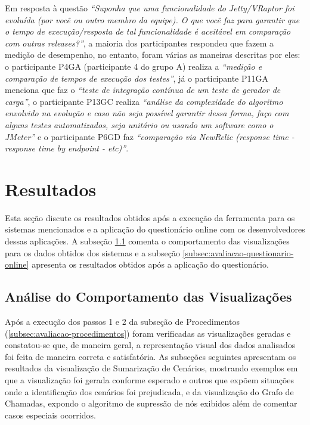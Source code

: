 Em resposta à questão \textit{``Suponha que uma funcionalidade do Jetty/VRaptor foi evoluída (por você ou outro membro da equipe). O que você faz para garantir que o tempo de execução/resposta de tal funcionalidade é aceitável em comparação com outras releases?''}, a maioria dos participantes respondeu que fazem a medição de desempenho, no entanto, foram várias as maneiras descritas por eles: o participante P4GA (participante 4 do grupo A) realiza a \textit{``medição e comparação de tempos de execução dos testes''}, já o participante P11GA menciona que faz o \textit{``teste de integração contínua de um teste de gerador de carga''}, o participante P13GC realiza \textit{``análise da complexidade do algoritmo envolvido na evolução e caso não seja possível garantir dessa forma, faço com alguns testes automatizados, seja unitário ou usando um software como o JMeter''} e o participante P6GD faz \textit{``comparação via NewRelic (response time - response time by endpoint - etc)''}.

\section{Resultados} \label{sec:avaliacao-resultados}

Esta seção discute os resultados obtidos após a execução da ferramenta para os sistemas mencionados e a aplicação do questionário online com os desenvolvedores dessas aplicações. A subseção \ref{subsec:avaliacao-comportamento-visualizacoes} comenta o comportamento das visualizações para os dados obtidos dos sistemas e a subseção \ref{subsec:avaliacao-questionario-online} apresenta os resultados obtidos após a aplicação do questionário.

\subsection{Análise do Comportamento das Visualizações} \label{subsec:avaliacao-comportamento-visualizacoes}

Após a execução dos passos 1 e 2 da subseção de Procedimentos (\ref{subsec:avaliacao-procedimentos}) foram verificadas as visualizações geradas e constatou-se que, de maneira geral, a representação visual dos dados analisados foi feita de maneira correta e satisfatória. As subseções seguintes apresentam os resultados da visualização de Sumarização de Cenários, mostrando exemplos em que a visualização foi gerada conforme esperado e outros que expõem situações onde a identificação dos cenários foi prejudicada, e da visualização do Grafo de Chamadas, expondo o algoritmo de supressão de nós exibidos além de comentar casos especiais ocorridos.

